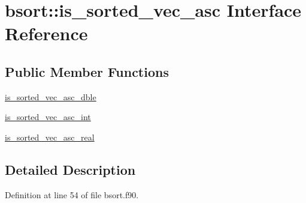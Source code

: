 \hypertarget{interfacebsort_1_1is__sorted__vec__asc}{\section{bsort\-:\-:is\-\_\-sorted\-\_\-vec\-\_\-asc Interface Reference}
\label{interfacebsort_1_1is__sorted__vec__asc}
}
\subsection*{Public Member Functions}
\begin{DoxyCompactItemize}
\item 
\hyperlink{interfacebsort_1_1is__sorted__vec__asc_afacfb3db55e4ade5a266750cd3187b27_afacfb3db55e4ade5a266750cd3187b27}{is\-\_\-sorted\-\_\-vec\-\_\-asc\-\_\-dble}
\item 
\hyperlink{interfacebsort_1_1is__sorted__vec__asc_a49fc85ca7ef8b165909a5e019b540097_a49fc85ca7ef8b165909a5e019b540097}{is\-\_\-sorted\-\_\-vec\-\_\-asc\-\_\-int}
\item 
\hyperlink{interfacebsort_1_1is__sorted__vec__asc_a2e9f3a51094b4500e49745de4a3da5fb_a2e9f3a51094b4500e49745de4a3da5fb}{is\-\_\-sorted\-\_\-vec\-\_\-asc\-\_\-real}
\end{DoxyCompactItemize}


\subsection{Detailed Description}


Definition at line 54 of file bsort.\-f90.



